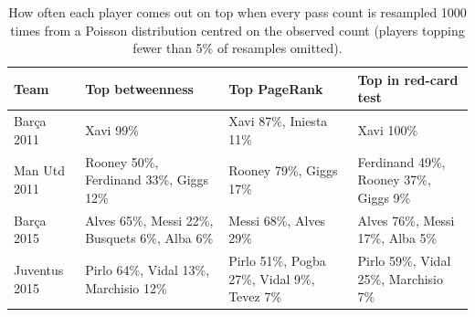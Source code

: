\begin{table}[t]
\centering\small
\caption{How often each player comes out on top when every pass count is resampled 1000 times from a Poisson distribution centred on the observed count (players topping fewer than 5\% of resamples omitted).}
\label{tab:bootstrap}
\begin{tabularx}{\textwidth}{lXXX}
\toprule
Team & Top betweenness & Top PageRank & Top in red-card test \\
\midrule
Barça 2011 & Xavi 99\% & Xavi 87\%, Iniesta 11\% & Xavi 100\% \\
Man Utd 2011 & Rooney 50\%, Ferdinand 33\%, Giggs 12\% & Rooney 79\%, Giggs 17\% & Ferdinand 49\%, Rooney 37\%, Giggs 9\% \\
Barça 2015 & Alves 65\%, Messi 22\%, Busquets 6\%, Alba 6\% & Messi 68\%, Alves 29\% & Alves 76\%, Messi 17\%, Alba 5\% \\
Juventus 2015 & Pirlo 64\%, Vidal 13\%, Marchisio 12\% & Pirlo 51\%, Pogba 27\%, Vidal 9\%, Tevez 7\% & Pirlo 59\%, Vidal 25\%, Marchisio 7\% \\
\bottomrule
\end{tabularx}
\end{table}
